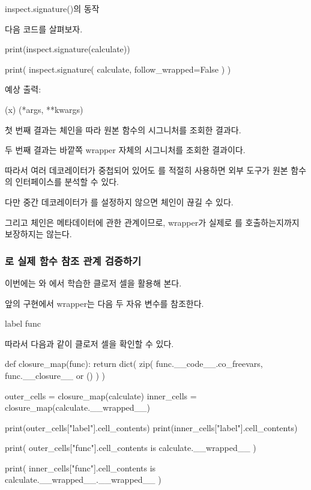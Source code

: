 \begin{dhknote}
\begin{dhksmry}[centered]
inspect.signature()의 동작
\end{dhksmry}
\end{dhknote}

다음 코드를 살펴보자.

\begin{dhkcode}
print(inspect.signature(calculate))

print(
    inspect.signature(
        calculate,
        follow_wrapped=False
    )
)
\end{dhkcode}

예상 출력:

\begin{dhkzsh}
(x)
(*args, **kwargs)
\end{dhkzsh}

첫 번째 결과는  체인을 따라 원본 함수의 시그니처를 조회한 결과다.

두 번째 결과는 바깥쪽 wrapper 자체의 시그니처를 조회한 결과이다.

따라서 여러 데코레이터가 중첩되어 있어도 를 적절히 사용하면 외부 도구가 원본 함수의 인터페이스를 분석할 수 있다.

다만 중간 데코레이터가 를 설정하지 않으면 체인이 끊길 수 있다.

그리고  체인은 메타데이터에 관한 관계이므로, wrapper가 실제로 를 호출하는지까지 보장하지는 않는다.

\subsubsection{로 실제 함수 참조 관계 검증하기}

이번에는 와 에서 학습한 클로저 셀을 활용해 본다.

앞의  구현에서 wrapper는 다음 두 자유 변수를 참조한다.

\begin{dhkcode}
label
func
\end{dhkcode}

따라서 다음과 같이 클로저 셀을 확인할 수 있다.

\begin{dhkcode}
def closure_map(func):
    return dict(
        zip(
            func.__code__.co_freevars,
            func.__closure__ or ()
        )
    )


outer_cells = closure_map(calculate)
inner_cells = closure_map(calculate.__wrapped__)

print(outer_cells["label"].cell_contents)
print(inner_cells["label"].cell_contents)

print(
    outer_cells["func"].cell_contents
    is calculate.__wrapped__
)

print(
    inner_cells["func"].cell_contents
    is calculate.__wrapped__.__wrapped__
)
\end{dhkcode}

